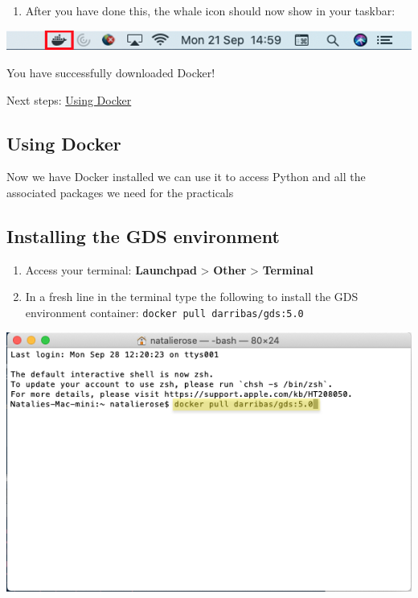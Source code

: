 \documentclass[
]{book}
\providecommand{\tightlist}{%
  \setlength{\itemsep}{0pt}\setlength{\parskip}{0pt}}
\begin{document}
\begin{enumerate}
\def\labelenumi{\arabic{enumi}.}
\setcounter{enumi}{4}
\tightlist
\item
  After you have done this, the whale icon should now show in your taskbar:
\end{enumerate}

\begin{center}\includegraphics[width=11.31in]{figs/chp1/Figure4} \end{center}

You have successfully downloaded Docker!

Next steps: \protect\hyperlink{using-docker}{Using Docker}

\hypertarget{using-docker}{%
\subsection*{Using Docker}\label{using-docker}}

Now we have Docker installed we can use it to access Python and all the associated packages we need for the practicals

\hypertarget{installing-the-gds-environment}{%
\subsection*{Installing the GDS environment}\label{installing-the-gds-environment}}

\begin{enumerate}
\def\labelenumi{\arabic{enumi}.}
\tightlist
\item
  Access your terminal: \textbf{Launchpad} \textgreater{} \textbf{Other} \textgreater{} \textbf{Terminal}
\item
  In a fresh line in the terminal type the following to install the GDS environment container: \texttt{docker\ pull\ darribas/gds:5.0}
\end{enumerate}

\begin{center}\includegraphics[width=7.94in]{figs/chp1/Figure5} \end{center}
\end{document}
